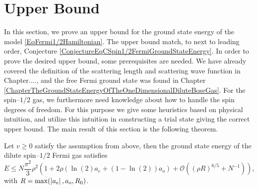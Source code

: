 \section{Upper Bound}
In this section, we prove an upper bound for the ground state energy of the model \eqref{EqFermi1/2Hamiltonian}. The upper bound match, to next to leading order, Conjecture \ref{ConjectureEqCSpin1/2FermiGroundStateEnergy}.
In order to prove the desired upper bound, some prerequisites are needed. We have already covered the definition of the scattering length and scattering wave function in Chapter...., and the free Fermi ground state was found in Chapter \eqref{ChapterTheGroundStateEnergyOfTheOneDimensionalDiluteBoseGas}. For the spin--$ 1/2 $ gas, we furthermore need knowledge about how to handle the spin degrees of freedom. For this purpose we give some heuristics based on physical intuition, and utilize this intuition in constructing a trial state giving the correct upper bound. 
The main result of this section is the following theorem.
\begin{theorem}\label{TheoremUpperBoundSpin1/2Fermi}
	Let $ v\geq0 $ satisfy the assumption from above, then the ground state energy of the dilute spin--$ 1/2 $ Fermi gas satisfies\begin{equation}\label{EqUpperBoundSpin1/2Fermi}
	E\leq N\frac{\pi^2}{3}\rho^2\left(1+2\rho \left(\ln(2) a_e+(1-\ln(2))a_o\right)+\mathcal{O}\left((\rho R)^{6/5}+N^{-1}\right)\right),
	\end{equation}
	with $ R=\max(\left\lvert a_e \right\rvert, a_o, R_0) $.
\end{theorem}
